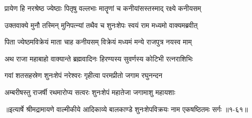 \twolineshloka
{प्रायेण हि नरश्रेष्ठ ज्येष्ठाः पितृषु वल्लभाः}
{मातॄणां च कनीयांसस्तस्माद् रक्ष्ये कनीयसम्} %

\twolineshloka
{उक्तवाक्ये मुनौ तस्मिन् मुनिपत्न्यां तथैव च}
{शुनःशेपः स्वयं राम मध्यमो वाक्यमब्रवीत्} %

\twolineshloka
{पिता ज्येष्ठमविक्रेयं माता चाह कनीयसम्}
{विक्रेयं मध्यमं मन्ये राजपुत्र नयस्व माम्} %

\twolineshloka
{अथ राजा महाबाहो वाक्यान्ते ब्रह्मवादिनः}
{हिरण्यस्य सुवर्णस्य कोटिभी रत्नराशिभिः} %

\twolineshloka
{गवां शतसहस्रेण शुनःशेपं नरेश्वरः}
{गृहीत्वा परमप्रीतो जगाम रघुनन्दन} %

\twolineshloka
{अम्बरीषस्तु राजर्षी रथमारोप्य सत्वरः}
{शुनःशेपं महातेजा जगामाशु महायशाः} %


॥इत्यार्षे श्रीमद्रामायणे वाल्मीकीये आदिकाव्ये बालकाण्डे शुनःशेपविक्रयः नाम एकषष्ठितमः सर्गः ॥१-६१॥
